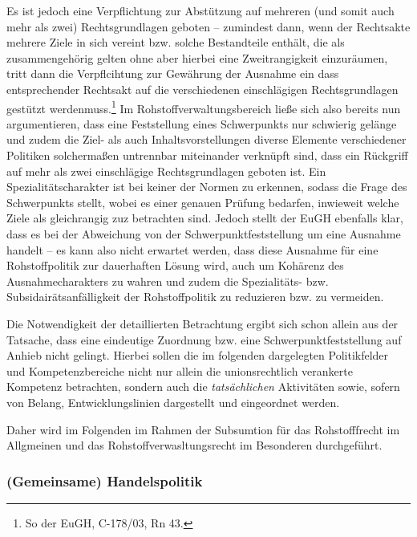 \documentclass[12pt,a4paper,oneside]{book} %
\begin{document}
	Es ist jedoch eine Verpflichtung zur Abstützung auf mehreren (und somit auch mehr als zwei) Rechtsgrundlagen geboten -- zumindest dann, wenn der Rechtsakte mehrere Ziele in sich vereint bzw. solche Bestandteile enthält, die als zusammengehörig gelten ohne aber hierbei eine Zweitrangigkeit einzuräumen, tritt dann die Verpflcihtung zur Gewährung der Ausnahme ein dass entsprechender Rechtsakt auf die \glqq verschiedenen einschlägigen Rechtsgrundlagen gestützt werden\grqq muss.\footnote{So der EuGH, C-178/03, Rn 43.} Im Rohstoffverwaltungsbereich ließe sich also bereits nun argumentieren, dass eine Feststellung eines Schwerpunkts nur schwierig gelänge und zudem die Ziel- als auch Inhaltsvorstellungen diverse Elemente verschiedener Politiken solchermaßen untrennbar miteinander verknüpft sind, dass ein Rückgriff auf mehr als zwei einschlägige Rechtsgrundlagen geboten ist. Ein Spezialitätscharakter ist bei keiner der Normen zu erkennen, sodass die Frage des Schwerpunkts stellt, wobei es einer genauen Prüfung bedarfen, inwieweit welche Ziele als gleichrangig zuz betrachten sind. Jedoch stellt der EuGH ebenfalls klar, dass es bei der Abweichung von der Schwerpunktfeststellung um eine Ausnahme handelt -- es kann also nicht erwartet werden, dass diese Ausnahme für eine Rohstoffpolitik zur dauerhaften Lösung wird, auch um Kohärenz des Ausnahmecharakters zu wahren und zudem die Spezialitäts- bzw. Subsidairätsanfälligkeit der Rohstoffpolitik zu reduzieren bzw. zu vermeiden.
	
	Die Notwendigkeit der detaillierten Betrachtung ergibt sich schon allein aus der Tatsache, dass eine eindeutige Zuordnung bzw. eine Schwerpunktfeststellung auf Anhieb nicht gelingt. Hierbei sollen die im folgenden dargelegten Politikfelder und Kompetenzbereiche nicht nur allein die unionsrechtlich verankerte Kompetenz betrachten, sondern auch die \textit{tatsächlichen} Aktivitäten sowie, sofern von Belang, Entwicklungslinien dargestellt und eingeordnet werden.
	
	Daher wird im Folgenden im Rahmen der Subsumtion für das Rohstofffrecht im Allgmeinen und das Rohstoffverwasltungsrecht im Besonderen durchgeführt.
	
	\subsubsection{(Gemeinsame) Handelspolitik}
	
	
\end{document}
